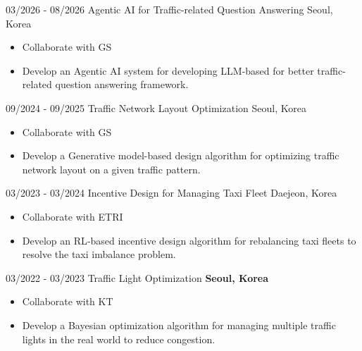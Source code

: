 \documentclass[10pt]{developercv} %
\begin{document}

\clearpage
{}
\begin{entrylist}
    \entry
        {03/2026 - 08/2026}
        {Agentic AI for Traffic-related Question Answering}
        {Seoul, Korea}
        {\vspace{-5pt}
        \begin{itemize}[noitemsep,topsep=0pt,parsep=2pt,partopsep=0pt, leftmargin=0pt]
            \item[] Collaborate with GS
            \item[] Develop an Agentic AI system for developing LLM-based for better traffic-related question answering framework.
        \end{itemize}
        }
    \entry
        {09/2024 - 09/2025}
        {Traffic Network Layout Optimization}
        {Seoul, Korea}
        {\vspace{-5pt}
        \begin{itemize}[noitemsep,topsep=0pt,parsep=2pt,partopsep=0pt, leftmargin=0pt]
            \item[] Collaborate with GS
            \item[] Develop a Generative model-based design algorithm for optimizing traffic network layout on a given traffic pattern.
        \end{itemize}
        }
	\entry
        {03/2023 - 03/2024}
		{Incentive Design for Managing Taxi Fleet} 
		{Daejeon, Korea}
        {\vspace{-5pt}
        \begin{itemize}[noitemsep,topsep=0pt,parsep=2pt,partopsep=0pt, leftmargin=0pt]
            \item[] Collaborate with ETRI
            \item[] Develop an RL‑based incentive design algorithm for rebalancing taxi fleets to resolve the taxi imbalance problem.
        \end{itemize}
        }
    \entry
        {03/2022 - 03/2023}
		{Traffic Light Optimization} 
		{\textbf{Seoul, Korea}}
        {\vspace{-5pt}
        \begin{itemize}[noitemsep,topsep=0pt,parsep=2pt,partopsep=0pt, leftmargin=0pt]
            \item[] Collaborate with KT
            \item[] Develop a Bayesian optimization algorithm for managing multiple traffic lights in the real world to reduce congestion.
        \end{itemize}
        }
 \end{entrylist}
\end{document}
